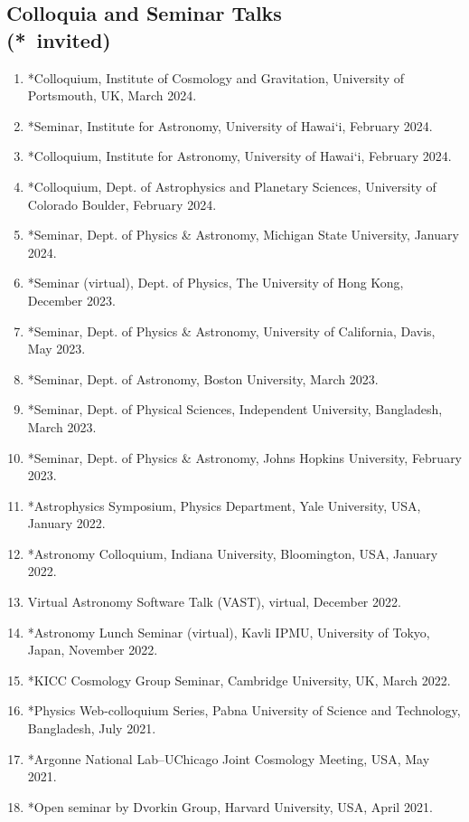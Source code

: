 \documentclass[margin, line]{res}
\begin{document}
\begin{resume}
\section{\sc Colloquia and Seminar Talks\\ ({*}\ invited)}
\begin{enumerate}
	\item *Colloquium, Institute of Cosmology and Gravitation, University of Portsmouth, UK, March 2024.
	\item *Seminar, Institute for Astronomy, University of Hawai`i, February 2024. 
	\item *Colloquium, Institute for Astronomy, University of Hawai`i, February 2024. 
	\item *Colloquium, Dept. of Astrophysics and Planetary Sciences, University of Colorado Boulder, February 2024.
	\item *Seminar, Dept. of Physics \& Astronomy, Michigan State University, January 2024.
	\item *Seminar (virtual), Dept. of Physics, The University of Hong Kong, December 2023.
	\item *Seminar, Dept. of Physics \& Astronomy, University of California, Davis, May 2023.
	\item *Seminar, Dept. of Astronomy, Boston University, March 2023.
	\item *Seminar, Dept. of Physical Sciences, Independent University, Bangladesh, March 2023.
	\item {*}Seminar, Dept. of Physics \& Astronomy, Johns Hopkins University, February 2023.
	\item {*}Astrophysics Symposium, Physics Department, Yale University, USA, January 2022.
	\item {*}Astronomy Colloquium, Indiana University, Bloomington, USA, January 2022.
	\item Virtual Astronomy Software Talk (VAST), virtual, December 2022.
	\item {*}Astronomy Lunch Seminar (virtual), Kavli IPMU, University of Tokyo, Japan, November 2022.
	\item {*}KICC Cosmology Group Seminar, Cambridge University, UK, March 2022.
	\item {*}Physics Web-colloquium Series, Pabna University of Science and Technology, Bangladesh, July 2021.
	\item {*}Argonne National Lab--UChicago Joint Cosmology Meeting, USA, May 2021.
	\item {*}Open seminar by Dvorkin Group, Harvard University, USA, April 2021.

\end{enumerate}
\end{resume}
\end{document}
